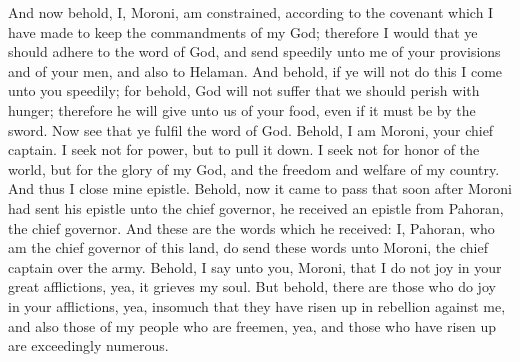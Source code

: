And now behold, I, Moroni, am constrained, according to the covenant which I have made to keep the commandments of my God; therefore I would that ye should adhere to the word of God, and send speedily unto me of your provisions and of your men, and also to Helaman.
\bverse \iffalse And behold, if ye will not do this I come unto you speedily; for behold, God will not suffer that we should perish with hunger; therefore he will give unto us of your food, even if it must be by the sword. Now see that ye fulfil the word of God. \fi
And behold, if ye will not do this I come unto you speedily; for behold, God will not suffer that we should perish with hunger; therefore he will give unto us of your food, even if it must be by the sword. Now see that ye fulfil the word of God.
\bverse \iffalse Behold, I am Moroni, your chief captain. I seek not for power, but to pull it down. I seek not for honor of the world, but for the glory of my God, and the freedom and welfare of my country. And thus I close mine epistle. \fi
Behold, I am Moroni, your chief captain. I seek not for power, but to pull it down. I seek not for honor of the world, but for the glory of my God, and the freedom and welfare of my country. And thus I close mine epistle.
\bchapter
\bverse \iffalse Behold, now it came to pass that soon after Moroni had sent his epistle unto the chief governor, he received an epistle from Pahoran, the chief governor. And these are the words which he received: \fi
Behold, now it came to pass that soon after Moroni had sent his epistle unto the chief governor, he received an epistle from Pahoran, the chief governor. And these are the words which he received:
\bverse \iffalse I, Pahoran, who am the chief governor of this land, do send these words unto Moroni, the chief captain over the army.  Behold, I say unto you, Moroni, that I do not joy in your great afflictions, yea, it grieves my soul. \fi
I, Pahoran, who am the chief governor of this land, do send these words unto Moroni, the chief captain over the army.  Behold, I say unto you, Moroni, that I do not joy in your great afflictions, yea, it grieves my soul.
\bverse \iffalse But behold, there are those who do joy in your afflictions, yea, insomuch that they have risen up in rebellion against me, and also those of my people who are freemen, yea, and those who have risen up are exceedingly numerous. \fi
But behold, there are those who do joy in your afflictions, yea, insomuch that they have risen up in rebellion against me, and also those of my people who are freemen, yea, and those who have risen up are exceedingly numerous.
